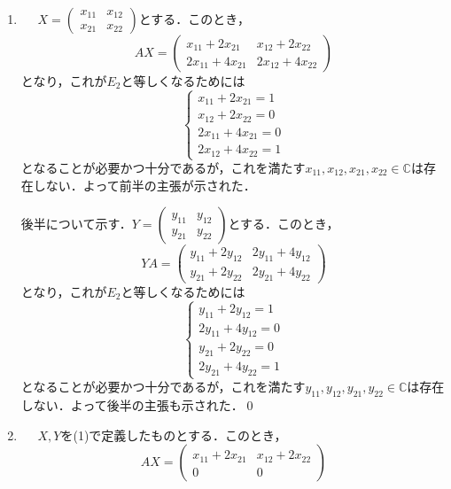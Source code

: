 \documentclass[a4paper,10pt,fleqn]{ltjsarticle}
\begin{document}
\begin{tleftbar}
  \begin{enumerate}
    \item \mbox{　}
          $ X =\begin{pmatrix} x_{11} & x_{12} \\ x_{21} & x_{22} \end{pmatrix}$とする．このとき，
          \[
            AX =\begin{pmatrix} x_{11}+2x_{21} &  x_{12}+2x_{22}  \\ 2x_{11} + 4x_{21} &2x_{12} + 4x_{22} \end{pmatrix}
          \]
          となり，これが$E_2$と等しくなるためには
          \[
            \begin{cases}
              x_{11}+2x_{21} =1   \\
              x_{12}+2x_{22}  =0  \\
              2x_{11} + 4x_{21}=0 \\
              2x_{12} + 4x_{22}=1
            \end{cases}
          \]
          となることが必要かつ十分であるが，これを満たす$x_{11},x_{12},x_{21},x_{22} \in \mathbb{C}$は存在しない．よって前半の主張が示された．\par
          後半について示す．$Y =\begin{pmatrix} y_{11} & y_{12} \\ y_{21} & y_{22} \end{pmatrix}$とする．このとき，
          \[
            YA = \begin{pmatrix} y_{11} +2y_{12} & 2y_{11}+4y_{12} \\ y_{21}+2y_{22} & 2y_{21}+4y_{22}  \end{pmatrix}
          \]
          となり，これが$E_2$と等しくなるためには
          \[
            \begin{cases}
              y_{11} +2y_{12}=1   \\
              2y_{11}+4y_{12}  =0 \\
              y_{21}+2y_{22} =0   \\
              2y_{21}+4y_{22} =1
            \end{cases}
          \]
          となることが必要かつ十分であるが，これを満たす$y_{11},y_{12},y_{21},y_{22} \in \mathbb{C}$は存在しない．よって後半の主張も示された．\qed
    \item \mbox{　}
          $X,Y$を(1)で定義したものとする．このとき，
          \[
            AX = \begin{pmatrix} x_{11}+2x_{21} & x_{12}+2x_{22} \\ 0 & 0 \end{pmatrix}
\]
\end{enumerate}
\end{tleftbar}
\end{document}
